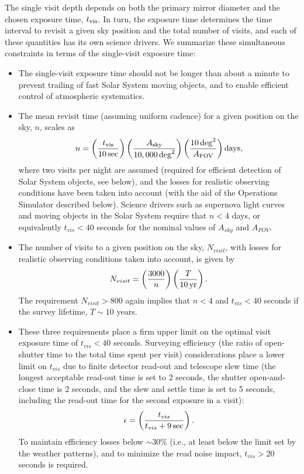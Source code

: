 The single visit depth depends on both the primary mirror diameter and the
chosen exposure time, $t_{\rm vis}$. In turn, the exposure time
determines the time interval to revisit a given sky position and the total
number of visits, and each of these quantities has its own science
drivers. We summarize these simultaneous constraints in terms of the
single-visit exposure time:
\begin{itemize}
\item  The single-visit exposure time should not be longer than about a minute to
         prevent trailing of fast Solar System moving objects, and to enable efficient
         control of atmospheric systematics.
\item  The mean revisit time (assuming uniform cadence) for a given position
         on the sky, $n$, scales as
\begin{equation}
  n = \left( {t_{\rm vis} \over 10  \, {\rm sec}} \right)
      \left( { A_{\rm sky} \over 10,000  \, {\rm deg}^2} \right)
      \left( {10 \, {\rm deg}^2 \over  A_{\rm FOV}} \right) {\rm days},
\end{equation}
where two visits per night are assumed (required for efficient detection of
Solar System objects, see below), and the losses for realistic observing conditions
have been taken into account (with the aid of the Operations Simulator described below).
Science drivers such as supernova light curves and moving objects in the Solar System require
that $n<4$ days, or equivalently $t_{vis} < 40$ seconds for the nominal values
of $A_{sky} $ and $A_{FOV}$.
\item  The number of visits to a given position on the sky, $N_{visit}$,
with losses for realistic observing conditions taken into account,
is given by
\begin{equation}
      N_{visit} = \left( {3000 \over n} \right)
                    \left( { T \over 10 \, {\rm yr}} \right).
\end{equation}
The requirement $N_{visit}>800$ again implies that $n<4$ and
$t_{vis} < 40$ seconds if the survey lifetime, $T \sim 10$ years.
\item  These three requirements place a firm upper limit on the
optimal visit exposure time of $t_{vis} < 40$ seconds. Surveying
efficiency (the ratio of open-shutter time to the total
time spent per visit) considerations place a lower limit on
$t_{vis}$ due to finite detector read-out and telescope slew time (the longest
acceptable read-out time is set to 2 seconds, the shutter open-and-close
time is 2 seconds, and the slew and settle time is set to 5 seconds, including
the read-out time for the second exposure in a visit):
\begin{equation}
      \epsilon = \left( {t_{vis} \over t_{vis} + 9 \, {\rm sec}}\right).
\end{equation}
To maintain efficiency losses below $\sim$30\% (i.e., at least below the
limit set by the weather patterns), and to minimize the read noise
impact, $t_{vis} > 20$ seconds is required.
\end{itemize}

